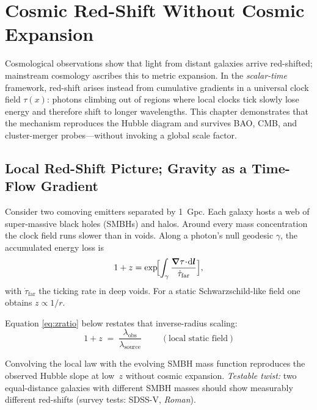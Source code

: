\chapter{Cosmic Red-Shift Without Cosmic Expansion}

Cosmological observations show that light from distant galaxies arrive red-shifted; mainstream cosmology ascribes this to metric expansion.  
In the \emph{scalar-time} framework, red-shift arises instead from cumulative gradients in a universal clock field $\tau(x)$: photons climbing out of regions where local clocks tick slowly lose energy and therefore shift to longer wavelengths.  
This chapter demonstrates that the mechanism reproduces the Hubble diagram and survives BAO, CMB, and cluster-merger probes—without invoking a global scale factor.


\section{Local Red-Shift Picture; Gravity as a Time-Flow Gradient}
\label{sec:localRS}

Consider two comoving emitters separated by \SI{1}{Gpc}.  
Each galaxy hosts a web of super-massive black holes (SMBHs) and halos.  
Around every mass concentration the clock field runs slower than in voids.  
Along a photon’s null geodesic $\gamma$, the accumulated energy loss is
\begin{equation}
  1+z = \exp\!\Bigl[\int_{\gamma}
         \frac{\grad \tau \!\cdot\! \dd\vb*{l}}
              {\dot{\tau}_{\text{far}}}\Bigr],
\end{equation}
with $\dot{\tau}_{\text{far}}$ the ticking rate in deep voids.  
For a static Schwarzschild-like field one obtains $z\propto1/r$.


Equation \eqref{eq:zratio} below restates that inverse-radius scaling:
\begin{equation}
  \boxed{\,1+z\;=\;\frac{\lambda_{\text{obs}}}{\lambda_{\text{source}}}\;}
  \qquad (\text{local static field})
  \label{eq:zratio}
\end{equation}

Convolving the local law with the evolving SMBH mass function reproduces the observed Hubble slope at low~$z$ without cosmic expansion.  
\emph{Testable twist:} two equal-distance galaxies with different SMBH masses should show measurably different red-shifts (survey tests: SDSS-V, \textit{Roman}).


